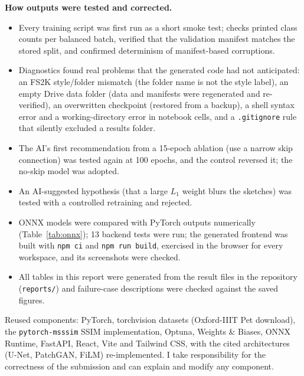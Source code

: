 \documentclass[conference]{IEEEtran}
\begin{document}
\textbf{How outputs were tested and corrected.}
\begin{itemize}
\item Every training script was first run as a short smoke test; checks printed class counts per balanced batch, verified that the validation manifest matches the stored split, and confirmed determinism of manifest-based corruptions.
\item Diagnostics found real problems that the generated code had not anticipated: an FS2K style/folder mismatch (the folder name is not the style label), an empty Drive data folder (data and manifests were regenerated and re-verified), an overwritten checkpoint (restored from a backup), a shell syntax error and a working-directory error in notebook cells, and a \texttt{.gitignore} rule that silently excluded a results folder.
\item The AI's first recommendation from a 15-epoch ablation (use a narrow skip connection) was tested again at 100 epochs, and the control reversed it; the no-skip model was adopted.
\item An AI-suggested hypothesis (that a large $L_1$ weight blurs the sketches) was tested with a controlled retraining and rejected.
\item ONNX models were compared with PyTorch outputs numerically (Table~\ref{tab:onnx}); 13 backend tests were run; the generated frontend was built with \texttt{npm ci} and \texttt{npm run build}, exercised in the browser for every workspace, and its screenshots were checked.
\item All tables in this report were generated from the result files in the repository (\texttt{reports/}) and failure-case descriptions were checked against the saved figures.
\end{itemize}
Reused components: PyTorch, torchvision datasets (Oxford-IIIT Pet download), the \texttt{pytorch-msssim} SSIM implementation, Optuna, Weights \& Biases, ONNX Runtime, FastAPI, React, Vite and Tailwind CSS, with the cited architectures (U-Net, PatchGAN, FiLM) re-implemented. I take responsibility for the correctness of the submission and can explain and modify any component.
\end{document}
